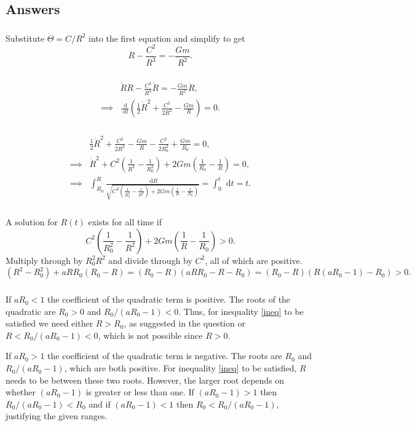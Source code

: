 \documentclass[]{article}
\newcommand{\bb}{\begin{equation}}
\newcommand{\ee}{\end{equation}}
\newcommand{\rd}{\text{ d}}
\renewcommand{\l}{\left(}
\renewcommand{\r}{\right)}
\begin{document}
\begin{Answ}
\subsection{Answers}
\subsubsection{}
Substitute $\dot{\Theta}=C/R^2$ into the first equation and simplify to get
\bb
\ddot{R}-\frac{C^2}{R^3}=-\frac{Gm}{R^2}.
\ee
\subsubsection{}
\begin{align}
&\dot{R}\ddot{R}-\frac{C^2}{R^3}\dot{R}=-\frac{Gm}{R^2}\dot{R},\nonumber\\
\implies&\frac{\rd}{\rd t}\l\frac{1}{2}\dot{R}^2+\frac{C^2}{2R^2}-\frac{Gm}{R}\r=0.
\end{align}

\subsubsection{}
\begin{align}
&\frac{1}{2}\dot{R}^2+\frac{C^2}{2R^2}-\frac{Gm}{R}-\frac{C^2}{2R_0^2}+\frac{Gm}{R_0}=0,\\
\implies &\dot{R}^2+C^2\l\frac{1}{R^2}-\frac{1}{R_0^2}\r+2Gm\l\frac{1}{R_0}-\frac{1}{R}\r=0,\\
\implies &\int^R_{R_0}\frac{\rd R}{\sqrt{C^2\l\frac{1}{R_0^2}-\frac{1}{R^2}\r+2Gm\l\frac{1}{R}-\frac{1}{R_0}\r}}=\int^t_0\rd t=t.
\end{align}
\subsubsection{}
A solution for $R(t)$ exists for all time if
\bb
C^2\l\frac{1}{R_0^2}-\frac{1}{R^2}\r+2Gm\l\frac{1}{R}-\frac{1}{R_0}\r>0.
\ee
Multiply through by $R_0^2R^2$ and divide through by $C^2$, all of which are positive.
\bb
\l R^2-R_0^2\r+aRR_0(R_0- R)=(R_0-R)\l aRR_0-R-R_0 \r=(R_0-R)\l R\l aR_0-1\r-R_0 \r>0.\label{ineq}
\ee
\subsubsection{}
If $aR_0<1$ the coefficient of the quadratic term is positive. The roots of the quadratic are $R_0>0$ and $R_0/(aR_0-1)<0$. Thus, for inequality \eqref{ineq} to be satisfied we need either $R>R_0$, as suggested in the question or $R<R_0/(aR_0-1)<0$, which is not possible since $R>0$.

If $aR_0>1$ the coefficient of the quadratic term is negative. The roots are $R_0$ and $R_0/(aR_0-1)$, which are both positive. For inequality \eqref{ineq} to be satisfied, $R$ needs to be between these two roots. However, the larger root depends on whether $(aR_0-1)$ is greater or less than one. If $(aR_0-1)>1$ then $R_0/(aR_0-1)<R_0$ and if $(aR_0-1)<1$ then $R_0<R_0/(aR_0-1)$, justifying the given ranges.
\end{Answ}
\end{document}
